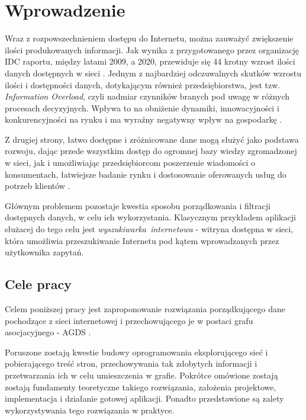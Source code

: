\chapter{Wprowadzenie}
\label{cha:wprowadzenie}

Wraz z rozpowszechnieniem dostępu do Internetu, można zauważyć zwiększenie ilości produkowanych informacji. Jak wynika z przygotowanego przez organizację IDC raportu, między latami 2009, a 2020, przewiduje się 44 krotny wzrost ilości danych dostępnych w sieci \cite{DigUni}. Jednym z najbardziej odczuwalnych skutków wzrostu ilości i dostępności danych, dotykającym również przedsiębiorstwa, jest tzw. \emph{Information Overload}, czyli nadmiar czynników branych pod uwagę  w różnych procesach decyzyjnych. Wpływa to na obniżenie dynamiki, innowacyjności i konkurencyjności na rynku i ma wyraźny negatywny wpływ na gospodarkę \cite{InfOver}.

Z drugiej strony, łatwo dostępne i zróżnicowane dane mogą służyć jako podstawa rozwoju, dając przede wszystkim dostęp do ogromnej bazy wiedzy zgromadzonej w sieci, jak i umożliwiając przedsiębiorcom poszerzenie wiadomości o konsumentach, łatwiejsze badanie rynku i dostosowanie oferowanych usług do potrzeb klientów \cite[s. 1-26]{DMining}.

Głównym problemem pozostaje kwestia sposobu porządkowania i filtracji dostępnych danych, w celu ich wykorzystania. Klasycznym przykładem aplikacji służacej do tego celu jest \emph{wyszukiwarka~internetowa} - witryna dostępna w sieci, która umożliwia przeszukiwanie Internetu pod kątem wprowadzanych przez użytkownika zapytań.


\section{Cele pracy}
\label{sec:celePracy}

Celem poniższej pracy jest zaproponowanie rozwiązania porządkującego dane pochodzące z sieci internetowej i przechowującego je w postaci grafu asocjacyjnego - AGDS \cite[s. 112-117]{Horzyk}.

Poruszone zostają kwestie budowy oprogramowania eksplorującego sieć i pobierającego treść stron, przechowywania tak zdobytych informacji i przetwarzania ich w celu umieszczenia w grafie. Pokrótce omówione zostają zostają fundamenty teoretyczne takiego rozwiązania, założenia projektowe,
implementacja i działanie gotowej aplikacji. Ponadto przedstawione są zalety wykorzystywania tego rozwiązania w praktyce. \newpage


